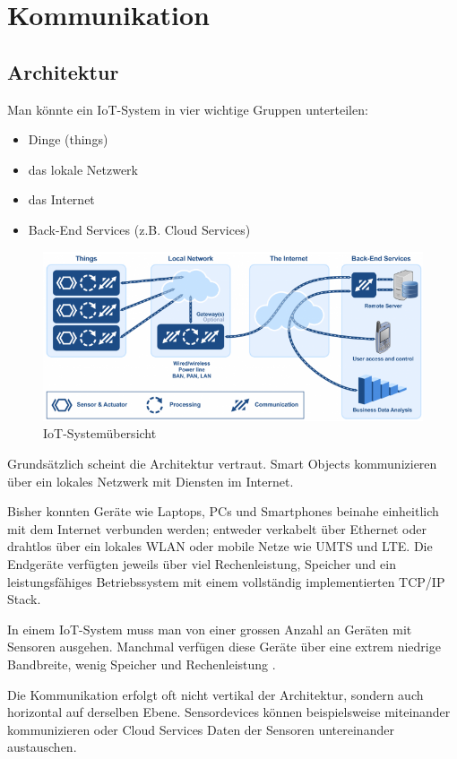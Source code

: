 \chapter{Kommunikation}
\section{Architektur}
Man könnte ein IoT-System in vier wichtige Gruppen unterteilen: \cite{IoTNetworks}
\begin{itemize}
\item Dinge (things)
\item das lokale Netzwerk
\item das Internet
\item Back-End Services (z.B. Cloud Services)
\end{itemize}
\begin{figure}[H]
\centering
\includegraphics[scale=0.8]{../02_Analyse/images/iot_system_overview_by_micrium.png}
\caption{IoT-Systemübersicht\cite{IoTOverview}}
\end{figure}
Grundsätzlich scheint die Architektur vertraut. Smart Objects kommunizieren über ein lokales Netzwerk mit Diensten im Internet.

Bisher konnten Geräte wie Laptops, PCs und Smartphones beinahe einheitlich mit dem Internet verbunden werden; entweder verkabelt über Ethernet oder drahtlos über ein lokales WLAN oder mobile Netze wie UMTS und LTE. Die Endgeräte verfügten jeweils über viel Rechenleistung, Speicher und ein leistungsfähiges Betriebssystem mit einem vollständig implementierten TCP/IP Stack. 

In einem IoT-System muss man von einer grossen Anzahl an Geräten mit Sensoren ausgehen. Manchmal verfügen diese Geräte über eine extrem niedrige Bandbreite, wenig Speicher und Rechenleistung \cite{CiscoIoTArchitecture}.

Die Kommunikation erfolgt oft nicht vertikal der Architektur, sondern auch horizontal auf derselben Ebene. Sensordevices können beispielsweise miteinander kommunizieren oder Cloud Services Daten der Sensoren untereinander austauschen.
\newpage
